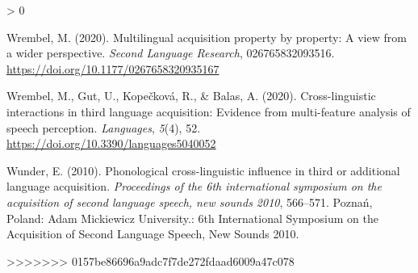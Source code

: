 \documentclass[
  english,
  man]{apa6}
\newlength{\cslhangindent}
\newenvironment{CSLReferences}[2] %
 {%
  \setlength{\parindent}{0pt}
  \ifodd #1 \everypar{\setlength{\hangindent}{\cslhangindent}}\ignorespaces\fi
  \ifnum #2 > 0
  \setlength{\parskip}{#2\baselineskip}
  \fi
 }%
 {}
\begin{document}
\begin{CSLReferences}{1}{0}
\leavevmode\hypertarget{ref-wrembel_multilingual_2020}{}%
Wrembel, M. (2020). Multilingual acquisition property by property: A view from a wider perspective. \emph{Second Language Research}, 026765832093516. \url{https://doi.org/10.1177/0267658320935167}

\leavevmode\hypertarget{ref-wrembel_cross-linguistic_2020}{}%
Wrembel, M., Gut, U., Kopečková, R., \& Balas, A. (2020). Cross-linguistic interactions in third language acquisition: Evidence from multi-feature analysis of speech perception. \emph{Languages}, \emph{5}(4), 52. \url{https://doi.org/10.3390/languages5040052}

\leavevmode\hypertarget{ref-wunder_phonological_2010}{}%
Wunder, E. (2010). Phonological cross-linguistic influence in third or additional language acquisition. \emph{Proceedings of the 6th international symposium on the acquisition of second language speech, new sounds 2010}, 566--571. Poznań, Poland: Adam Mickiewicz University.: 6th International Symposium on the Acquisition of Second Language Speech, New Sounds 2010.

>>>>>>> 0157be86696a9adc7f7de272fdaad6009a47c078
\end{CSLReferences}

\endgroup
\end{document}
